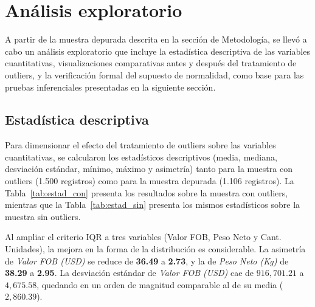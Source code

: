 \documentclass[12pt]{article}
\begin{document}
\section{Análisis exploratorio}

A partir de la muestra depurada descrita en la sección de Metodología,
se llevó a cabo un análisis exploratorio que incluye la estadística
descriptiva de las variables cuantitativas, visualizaciones
comparativas antes y después del tratamiento de outliers, y la
verificación formal del supuesto de normalidad, como base para las
pruebas inferenciales presentadas en la siguiente sección.

\subsection{Estadística descriptiva}

Para dimensionar el efecto del tratamiento de outliers sobre las
variables cuantitativas, se calcularon los estadísticos descriptivos
(media, mediana, desviación estándar, mínimo, máximo y asimetría) tanto
para la muestra con outliers (1.500 registros) como para la muestra
depurada (1.106 registros). La Tabla~\ref{tab:estad_con} presenta los
resultados sobre la muestra con outliers, mientras que la
Tabla~\ref{tab:estad_sin} presenta los mismos estadísticos sobre la
muestra sin outliers.

Al ampliar el criterio IQR a tres variables (Valor FOB, Peso Neto y
Cant. Unidades), la mejora en la forma de la distribución es
considerable. La asimetría de \emph{Valor FOB (USD)} se reduce de
\textbf{36.49} a \textbf{2.73}, y la de \emph{Peso Neto (Kg)} de
\textbf{38.29} a \textbf{2.95}. La desviación estándar de
\emph{Valor FOB (USD)} cae de \(916{,}701.21\) a \(4{,}675.58\),
quedando en un orden de magnitud comparable al de su media
(\(2{,}860.39\)).
\end{document}
